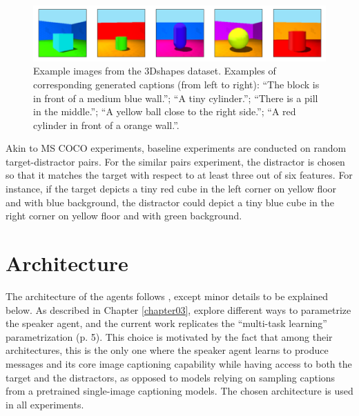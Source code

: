 \begin{figure}
	\centering
	\includegraphics[width=\linewidth]{images/3dshapes_example.png}
	\caption{Example images from the 3Dshapes dataset. Examples of corresponding generated captions (from left to right): ``The block is in front of a medium blue wall.''; ``A tiny cylinder.''; ``There is a pill in the middle.''; ``A yellow ball close to the right side.''; ``A red cylinder in front of a orange wall.''.}
	\label{fig:3dshapes_example_short}
\end{figure} 

Akin to MS COCO experiments, baseline experiments are conducted on random target-distractor pairs. For the similar pairs experiment, the distractor is chosen so that it matches the target with respect to at least three out of six features. For instance, if the target depicts a tiny red cube in the left corner on yellow floor and with blue background, the distractor could depict a tiny blue cube in the right corner on yellow floor and with green background.



\section{Architecture}
\label{architecture}
The architecture of the agents follows \textcite{lazaridou2020multi}, except minor details to be explained below. As described in Chapter \ref{chapter03}, \textcite{lazaridou2020multi} explore different ways to parametrize the speaker agent, and the current work replicates the ``multi-task learning'' parametrization (p. 5). This choice is motivated by the fact that among their architectures, this is the only one where the speaker agent learns to produce messages and its core image captioning capability while having access to both the target and the distractors, as opposed to models relying on sampling captions from a pretrained single-image captioning models. The chosen architecture is used in all experiments.

